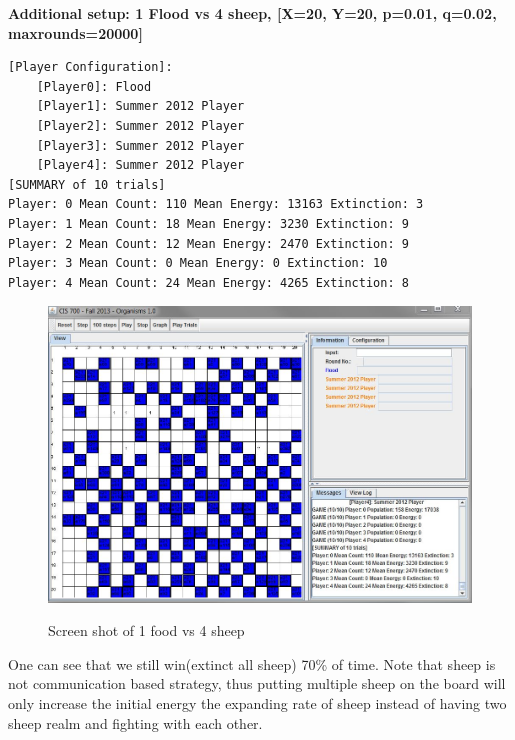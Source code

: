 \textbf{Additional setup: 1 Flood vs 4 sheep, [X=20, Y=20, p=0.01, q=0.02, maxrounds=20000]}
\begin{verbatim}
[Player Configuration]:
	[Player0]: Flood
	[Player1]: Summer 2012 Player
	[Player2]: Summer 2012 Player
	[Player3]: Summer 2012 Player
	[Player4]: Summer 2012 Player
[SUMMARY of 10 trials]
Player: 0 Mean Count: 110 Mean Energy: 13163 Extinction: 3
Player: 1 Mean Count: 18 Mean Energy: 3230 Extinction: 9
Player: 2 Mean Count: 12 Mean Energy: 2470 Extinction: 9
Player: 3 Mean Count: 0 Mean Energy: 0 Extinction: 10
Player: 4 Mean Count: 24 Mean Energy: 4265 Extinction: 8
\end{verbatim}

\begin{figure}[ht]
\centering
  \includegraphics[width=150mm]{figs/1v4.JPG}\\
  \caption{Screen shot of 1 food vs 4 sheep}\label{fig:1v4}
\end{figure}

One can see that we still win(extinct all sheep) 70\% of time.
Note that sheep is not communication based strategy, thus putting multiple 
sheep on the board will only increase the initial energy the expanding rate 
of sheep instead of having two sheep realm and fighting with each other.
